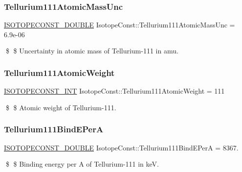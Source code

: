 \subsubsection{\texorpdfstring{Tellurium111\+Atomic\+Mass\+Unc}{Tellurium111AtomicMassUnc}}
{\footnotesize\ttfamily \mbox{\hyperlink{group___isotope_const-_macros_ga8f45a7272ce02c0b4c65c44636ed719a}{I\+S\+O\+T\+O\+P\+E\+C\+O\+N\+S\+T\+\_\+\+D\+O\+U\+B\+LE}} Isotope\+Const\+::\+Tellurium111\+Atomic\+Mass\+Unc = 6.\+9e-\/06}

\$ \$ Uncertainty in atomic mass of Tellurium-\/111 in amu. \mbox{\label{group___isotope_const-_tellurium-_te111_ga035a10b9b73d94a060479738e375d192}} 
\subsubsection{\texorpdfstring{Tellurium111\+Atomic\+Weight}{Tellurium111AtomicWeight}}
{\footnotesize\ttfamily \mbox{\hyperlink{group___isotope_const-_macros_ga5f18360b3e99483a35c32d789e62621c}{I\+S\+O\+T\+O\+P\+E\+C\+O\+N\+S\+T\+\_\+\+I\+NT}} Isotope\+Const\+::\+Tellurium111\+Atomic\+Weight = 111}

\$ \$ Atomic weight of Tellurium-\/111. \mbox{\label{group___isotope_const-_tellurium-_te111_ga1014a0b58aae12d2ee393e889910d55d}} 
\subsubsection{\texorpdfstring{Tellurium111\+Bind\+E\+PerA}{Tellurium111BindEPerA}}
{\footnotesize\ttfamily \mbox{\hyperlink{group___isotope_const-_macros_ga8f45a7272ce02c0b4c65c44636ed719a}{I\+S\+O\+T\+O\+P\+E\+C\+O\+N\+S\+T\+\_\+\+D\+O\+U\+B\+LE}} Isotope\+Const\+::\+Tellurium111\+Bind\+E\+PerA = 8367.}

\$ \$ Binding energy per A of Tellurium-\/111 in keV. \mbox{\label{group___isotope_const-_tellurium-_te111_ga605c6dc8ded8f9ca3bc9671c01db464c}} 
